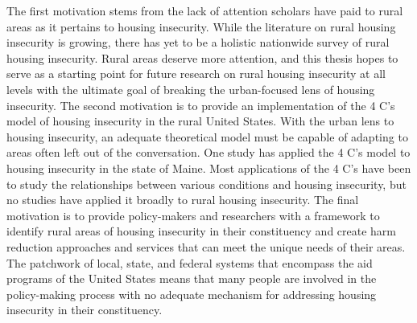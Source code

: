 The first motivation stems from the lack of attention scholars have paid to rural areas as it pertains to housing insecurity. While the literature on rural housing insecurity is growing, there has yet to be a holistic nationwide survey of rural housing insecurity. Rural areas deserve more attention, and this thesis hopes to serve as a starting point for future research on rural housing insecurity at all levels with the ultimate goal of breaking the urban-focused lens of housing insecurity. The second motivation is to provide an implementation of the 4 C's model of housing insecurity in the rural United States. With the urban lens to housing insecurity, an adequate theoretical model must be capable of adapting to areas often left out of the conversation. One study \citep{gleason_using_2021} has applied the 4 C's model to housing insecurity in the state of Maine. Most applications of the 4 C's have been to study the relationships between various conditions and housing insecurity, but no studies have applied it broadly to rural housing insecurity. The final motivation is to provide policy-makers and researchers with a framework to identify rural areas of housing insecurity in their constituency and create harm reduction approaches and services that can meet the unique needs of their areas. The patchwork of local, state, and federal systems that encompass the aid programs of the United States means that many people are involved in the policy-making process with no adequate mechanism for addressing housing insecurity in their constituency.

